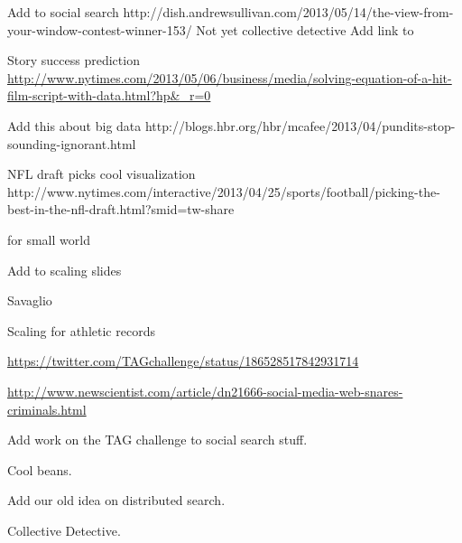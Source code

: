 Add to social search
http://dish.andrewsullivan.com/2013/05/14/the-view-from-your-window-contest-winner-153/
Not yet collective detective
Add link to 

Story success prediction
\url{http://www.nytimes.com/2013/05/06/business/media/solving-equation-of-a-hit-film-script-with-data.html?hp&_r=0}


\begin{frame}

Add this about big data
http://blogs.hbr.org/hbr/mcafee/2013/04/pundits-stop-sounding-ignorant.html
  
\end{frame}

\begin{frame}

NFL draft picks
cool visualization
http://www.nytimes.com/interactive/2013/04/25/sports/football/picking-the-best-in-the-nfl-draft.html?smid=tw-share
  
\end{frame}



\begin{frame}
  for small world 
  \cite{rutherford2013a}

\end{frame}




\begin{frame}
  Add to scaling slides
  
  Savaglio

  Scaling for athletic records
  
\end{frame}


\begin{frame}

\url{https://twitter.com/TAGchallenge/status/186528517842931714}

\url{http://www.newscientist.com/article/dn21666-social-media-web-snares-criminals.html}

\cite{rutherford2013a}

Add work on the TAG challenge to social search stuff.

Cool beans.

Add our old idea 
on distributed search.

Collective Detective.
  
\end{frame}


